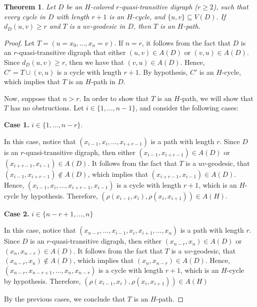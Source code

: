 \documentclass[10pt,a4paper]{article}
\newtheorem{theorem}{Theorem}[section]
\begin{document}
\begin{theorem}
\label{cycleskquasitrans}
Let $D$ be an $H$-colored $r$-quasi-transitive digraph ($r \geq 2$), such that every cycle in $D$ with length $r+1$ is an $H$-cycle, and $\{ u, v \} \subseteq V(D)$. If $d_{D}(u,v) \geq r$ and $T$ is a $uv$-geodesic in $D$, then $T$ is an $H$-path.
\end{theorem}
\begin{proof}
Let $T=(u=x_{0}, \ldots , x_{n} = v)$. If $n=r$, it follows from the fact that $D$ is an $r$-quasi-transitive digraph that either $(u,v) \in A(D)$ or $(v,u) \in A(D)$. Since $d_{D}(u,v)\geq r$, then we have that $( v,u) \in A(D)$. Hence, $C' = T \cup (v,u)$ is a cycle with length $r+1$. By hypothesis, $C'$ is an $H$-cycle, which implies that $T$ is an $H$-path in $D$.

Now, suppose that $n > r$. In order to show that $T$ is an $H$-path, we will show that $T$ has no obstructions. Let $i \in \{1, \ldots , n-1\}$, and consider the following cases:
	\begin{description}
	\item \textbf{Case 1.} $i \in \{ 1, \ldots, n-r \}$.
	
	In this case, notice that $(x_{i-1}, x_{i}, \ldots , x_{i+r-1})$ is a path with length $r$. Since $D$ is an $r$-quasi-transitive digraph, then either $(x_{i-1}, x_{i+r-1}) \in A(D)$ or $(x_{i+r-1}, x_{i-1})\in A(D)$. It follows from the fact that $T$ is a $uv$-geodesic, that $(x_{i-1}, x_{i+r-1}) \notin A(D)$, which implies that $(x_{i+r-1}, x_{i-1})\in A(D)$. Hence, $(x_{i-1},x_{i},  \ldots , x_{i+r-1}, x_{i-1})$ is a cycle with length $r+1$, which is an $H$-cycle by hypothesis. Therefore, $(\rho (x_{i-1}, x_{i}), \rho (x_{i}, x_{i+1})) \in A(H)$.
	
	\item \textbf{Case 2.} $i \in \{ n-r+1, \ldots , n \}$
	
	In this case, notice that $(x_{n-r} , \ldots , x_{i-1}, x_{i}, x_{i+1}, \ldots ,  x_{n})$ is a path with length $r$. Since $D$ is an $r$-quasi-transitive digraph, then either $(x_{n-r}, x_{n}) \in A(D)$ or $(x_{n}, x_{n-r})\in A(D)$. It follows from the fact that $T$ is a $uv$-geodesic, that $(x_{n-r}, x_{n}) \notin A(D)$, which implies that $(x_{n}, x_{n-r})\in A(D)$. Hence, $(x_{n-r}, x_{n-r+1}, \ldots , x_{n}, x_{n-r})$ is a cycle with length $ r+1$, which is an $H$-cycle by hypothesis. Therefore, $(\rho (x_{i-1}, x_{i}), \rho (x_{i}, x_{i+1})) \in A(H)$
	\end{description}
By the previous cases, we conclude that $T$ is an $H$-path.
\end{proof}
\end{document}
